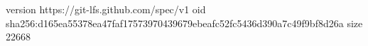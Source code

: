 version https://git-lfs.github.com/spec/v1
oid sha256:d165ea55378ea47faf17573970439679ebeafc52fc5436d390a7c49f9bf8d26a
size 22668
